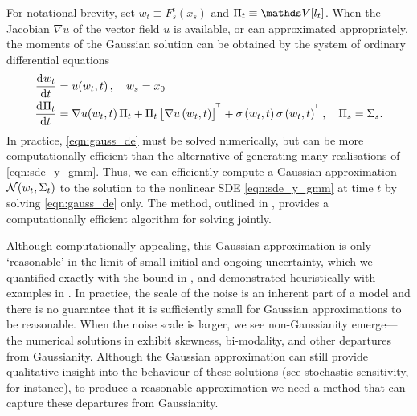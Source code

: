 For notational brevity, set \(w_t \equiv F_s^t\!\left(x_s\right)\) and \(\Pi_t \equiv \var{l_t}\).
When the Jacobian \(\nabla u\) of the vector field \(u\) is available, or can approximated appropriately, the moments of the Gaussian solution can be obtained by the system of ordinary differential equations
\begin{subequations}\label{eqn:gauss_de}
	\begin{align}
		\dod{w_t}{t}   & = u\!\left(w_t, t\right), \quad w_s = x_0 \label{eqn:gauss_mean_de}                                                                                                           \\
		\dod{\Pi_t}{t} & = \begin{multlined}[t]
			                   \nabla u\!\left(w_t, t\right) \Pi_t + \Pi_t\left[\nabla u\left(w_t, t\right)\right]^{\T} + \sigma\left(w_t, t \right)\sigma\left(w_t, t\right)^{\T}, \quad \Pi_s = \Sigma_s.
		                   \end{multlined}
		\label{eqn:gauss_cov_de}
	\end{align}
\end{subequations}
In practice, \cref{eqn:gauss_de} must be solved numerically, but can be more computationally efficient than the alternative of generating many realisations of \cref{eqn:sde_y_gmm}.
Thus, we can efficiently compute a Gaussian approximation \(\mathcal{N}\!\left(w_t, \Sigma_t\right)\) to the solution to the nonlinear SDE \cref{eqn:sde_y_gmm} at time \(t\) by solving \cref{eqn:gauss_de} only.
The \citet{Mazzoni_2008_ComputationalAspectsContinuous} method, outlined in , provides a computationally efficient algorithm for solving  jointly.

Although computationally appealing, this Gaussian approximation is only `reasonable' in the limit of small initial and ongoing uncertainty, which we quantified exactly with the bound in , and demonstrated heuristically with examples in .
In practice, the scale of the noise is an inherent part of a model and there is no guarantee that it is sufficiently small for Gaussian approximations to be reasonable.
When the noise scale is larger, we see non-Gaussianity emerge---the numerical solutions in  exhibit skewness, bi-modality, and other departures from Gaussianity.
Although the Gaussian approximation can still provide qualitative insight into the behaviour of these solutions (see stochastic sensitivity, for instance), to produce a reasonable approximation we need a method that can capture these departures from Gaussianity.

